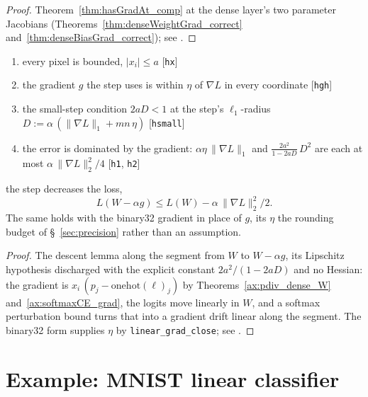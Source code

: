 \begin{proof}
\leanok
Theorem~\ref{thm:hasGradAt_comp} at the dense layer's two parameter
Jacobians (Theorems~\ref{thm:denseWeightGrad_correct}
and~\ref{thm:denseBiasGrad_correct}); see
.
\end{proof}

\begin{theorem}
  \label{thm:linear_sgd_descends}
  \leanok
  \Assume{}
  \begin{enumerate}
    \item every pixel is bounded, \(|x_i| \le a\) \hfill[\texttt{hx}]
    \item the gradient \(g\) the step uses is within \(\eta\) of
          \(\nabla L\) in every coordinate \hfill[\texttt{hgh}]
    \item the small-step condition \(2aD < 1\) at the step's
          \(\ell_1\)-radius \(D := \alpha\,(\|\nabla L\|_1 + mn\,\eta)\)
          \hfill[\texttt{hsmall}]
    \item the error is dominated by the gradient:
          \(\alpha\eta\,\|\nabla L\|_1\) and \(\tfrac{2a^2}{1-2aD}\,D^2\)
          are each at most \(\alpha\,\|\nabla L\|_2^2/4\)
          \hfill[\texttt{h1}, \texttt{h2}]
  \end{enumerate}
  \Prove{} the step decreases the loss,
  \[
    L(W - \alpha g) \le L(W) - \alpha\,\|\nabla L\|_2^2/2 .
  \]
  The same holds with the binary32 gradient in place of \(g\), its
  \(\eta\) the rounding budget of \S~\ref{sec:precision} rather than an
  assumption.
\end{theorem}

\begin{proof}
\leanok
The descent lemma along the segment from \(W\) to \(W - \alpha g\), its
Lipschitz hypothesis discharged with the explicit constant
\(2a^2/(1-2aD)\) and no Hessian: the gradient is
\(x_i\,(p_j - \mathrm{onehot}(\ell)_j)\) by
Theorems~\ref{ax:pdiv_dense_W} and~\ref{ax:softmaxCE_grad}, the logits
move linearly in \(W\), and a softmax perturbation bound turns that into
a gradient drift linear along the segment. The binary32 form supplies
\(\eta\) by \texttt{linear\_grad\_close}; see
.
\end{proof}

\section{Example: MNIST linear classifier}

